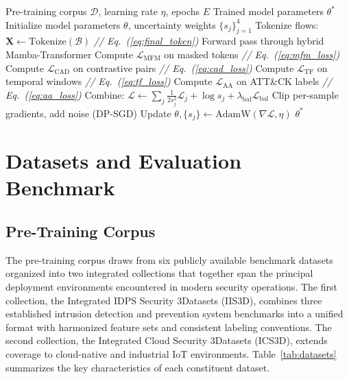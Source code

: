 \documentclass[journal]{IEEEtran}
\newcommand{\modelname}{CyberSecLLM}
\begin{document}
\begin{algorithm}[!t]
\caption{Multi-Task Pre-Training of \modelname{}}
\label{alg:pretraining}
\begin{algorithmic}[1]
\REQUIRE Pre-training corpus $\mathcal{D}$, learning rate $\eta$, epochs $E$
\ENSURE Trained model parameters $\theta^*$
\STATE Initialize model parameters $\theta$, uncertainty weights $\{s_j\}_{j=1}^4$
    \STATE Tokenize flows: $\mathbf{X} \gets \text{Tokenize}(\mathcal{B})$ \hfill \textit{// Eq.~(\ref{eq:final_token})}
    \STATE Forward pass through hybrid Mamba-Transformer
    \STATE Compute $\mathcal{L}_{\text{MFM}}$ on masked tokens \hfill \textit{// Eq.~(\ref{eq:mfm_loss})}
    \STATE Compute $\mathcal{L}_{\text{CAD}}$ on contrastive pairs \hfill \textit{// Eq.~(\ref{eq:cad_loss})}
    \STATE Compute $\mathcal{L}_{\text{TF}}$ on temporal windows \hfill \textit{// Eq.~(\ref{eq:tf_loss})}
    \STATE Compute $\mathcal{L}_{\text{AA}}$ on ATT\&CK labels \hfill \textit{// Eq.~(\ref{eq:aa_loss})}
    \STATE Combine: $\mathcal{L} \gets \sum_j \frac{1}{2s_j^2}\mathcal{L}_j + \log s_j + \lambda_{\text{bal}}\mathcal{L}_{\text{bal}}$
    \STATE Clip per-sample gradients, add noise (DP-SGD)
    \STATE Update $\theta, \{s_j\} \gets \text{AdamW}(\nabla \mathcal{L}, \eta)$
  \ENDFOR
\ENDFOR
\RETURN $\theta^*$
\end{algorithmic}
\end{algorithm}

\section{Datasets and Evaluation Benchmark}
\label{sec:datasets}

\subsection{Pre-Training Corpus}
\label{subsec:pretrain_data}

The pre-training corpus draws from six publicly available benchmark datasets organized into two integrated collections that together span the principal deployment environments encountered in modern security operations. The first collection, the Integrated IDPS Security 3Datasets (IIS3D), combines three established intrusion detection and prevention system benchmarks into a unified format with harmonized feature sets and consistent labeling conventions. The second collection, the Integrated Cloud Security 3Datasets (ICS3D), extends coverage to cloud-native and industrial IoT environments. Table~\ref{tab:datasets} summarizes the key characteristics of each constituent dataset.
\end{document}
